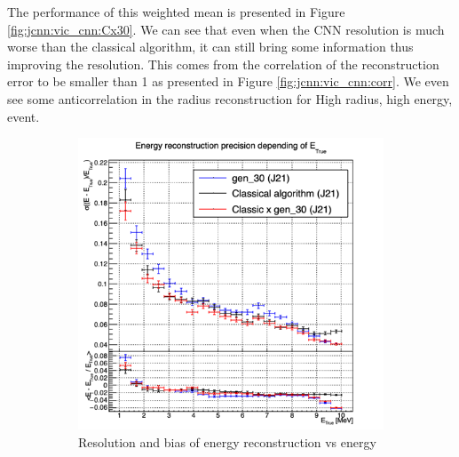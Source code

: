 \documentclass[../main.tex]{subfiles}
\begin{document}
The performance of this weighted mean is presented in Figure \ref{fig:jcnn:vic_cnn:Cx30}. We can see that even when the CNN resolution is much worse than the classical algorithm, it can still bring some information thus improving the resolution. This comes from the correlation of the reconstruction error to be smaller than 1 as presented in Figure \ref{fig:jcnn:vic_cnn:corr}. We even see some anticorrelation in the radius reconstruction for High radius, high energy, event.


\begin{figure}[ht]
  \centering
  \begin{subfigure}[t]{0.32\linewidth}
    \centering
    \includegraphics[width=\linewidth]{images/jcnn/vic_cnn/multi_vic_cnn_Cx30_MESBvETC.png}
    \caption{Resolution and bias of energy reconstruction vs energy}
    \label{fig:jcnn:vic_cnn:multi_vic_cnn_Cx30_MESBvETC}
  \end{subfigure}
  \begin{subfigure}[t]{0.32\linewidth}
    \centering

\end{subfigure}
\end{figure}
\end{document}
